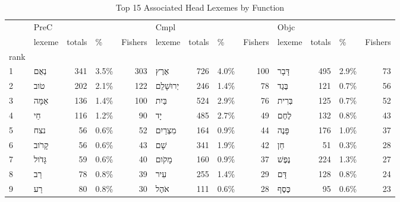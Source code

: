 \begin{table}[htbp!]
\centering
\caption{Top 15 Associated Head Lexemes by Function}
\label{table:pco_lexs}
\begin{adjustbox}{width=1\textwidth}
\begin{tabular}{llrlrlrlrlrlr}
\toprule
{} & \multicolumn{4}{l}{PreC} & \multicolumn{4}{l}{Cmpl} & \multicolumn{4}{l}{Objc} \\
{} &                lexeme & totals &     \% & Fishers &                     lexeme & totals &     \% & Fishers &                  lexeme & totals &     \% & Fishers \\
rank &                       &        &       &         &                            &        &       &         &                         &        &       &         \\
\midrule
1    &    \texthebrew{נְאֻם} &    341 &  3.5\% &     303 &         \texthebrew{אֶרֶץ} &    726 &  4.0\% &     100 &     \texthebrew{דָּבָר} &    495 &  2.9\% &      73 \\
2    &     \texthebrew{טֹוב} &    202 &  2.1\% &     122 &  \texthebrew{יְרוּשָׁלִַם} &    246 &  1.4\% &      78 &     \texthebrew{בֶּגֶד} &    121 &  0.7\% &      56 \\
3    &   \texthebrew{אַמָּה} &    136 &  1.4\% &     100 &        \texthebrew{בַּיִת} &    524 &  2.9\% &      76 &    \texthebrew{בְּרִית} &    125 &  0.7\% &      52 \\
4    &      \texthebrew{חַי} &    116 &  1.2\% &      90 &           \texthebrew{יָד} &    485 &  2.7\% &      49 &      \texthebrew{לֶחֶם} &    132 &  0.8\% &      43 \\
5    &      \texthebrew{נצח} &     56 &  0.6\% &      52 &     \texthebrew{מִצְרַיִם} &    164 &  0.9\% &      44 &     \texthebrew{פָּנֶה} &    176 &  1.0\% &      37 \\
6    &   \texthebrew{קָרֹוב} &     56 &  0.6\% &      43 &          \texthebrew{שָׁם} &    341 &  1.9\% &      42 &        \texthebrew{חֵן} &     51 &  0.3\% &      28 \\
7    &  \texthebrew{גָּדֹול} &     59 &  0.6\% &      40 &        \texthebrew{מָקֹום} &    160 &  0.9\% &      37 &     \texthebrew{נֶפֶשׁ} &    224 &  1.3\% &      27 \\
8    &      \texthebrew{רַב} &     78 &  0.8\% &      39 &          \texthebrew{עִיר} &    255 &  1.4\% &      29 &       \texthebrew{דָּם} &    128 &  0.8\% &      24 \\
9    &      \texthebrew{רַע} &     80 &  0.8\% &      30 &         \texthebrew{אֹהֶל} &    111 &  0.6\% &      28 &     \texthebrew{כֶּסֶף} &     95 &  0.6\% &      23 \\

\end{tabular}
\end{adjustbox}
\end{table}
